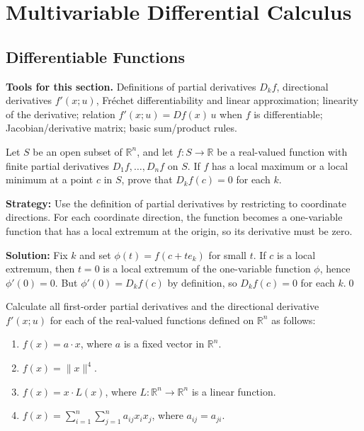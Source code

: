 \chapter{Multivariable Differential Calculus}

\section{Differentiable Functions}

\noindent\textbf{Tools for this section.} Definitions of partial derivatives $D_k f$, directional derivatives $f'(x;u)$, Fréchet differentiability and linear approximation; linearity of the derivative; relation $f'(x;u)=Df(x)\,u$ when $f$ is differentiable; Jacobian/derivative matrix; basic sum/product rules.



\begin{problembox}
\begin{problemstatement}
Let \( S \) be an open subset of \( \mathbb{R}^n \), and let \( f: S \to \mathbb{R} \) be a real-valued function with finite partial derivatives \( D_1f, \ldots, D_nf \) on \( S \). If \( f \) has a local maximum or a local minimum at a point \( c \) in \( S \), prove that \( D_kf(c) = 0 \) for each \( k \).
\end{problemstatement}
\end{problembox}

\noindent\textbf{Strategy:} Use the definition of partial derivatives by restricting to coordinate directions. For each coordinate direction, the function becomes a one-variable function that has a local extremum at the origin, so its derivative must be zero.

\bigskip\noindent\textbf{Solution:}
Fix $k$ and set $\phi(t)=f(c+te_k)$ for small $t$. If $c$ is a local extremum, then $t=0$ is a local extremum of the one-variable function $\phi$, hence $\phi'(0)=0$. But $\phi'(0)=D_k f(c)$ by definition, so $D_k f(c)=0$ for each $k$.\qed


\begin{problembox}
\begin{problemstatement}
Calculate all first-order partial derivatives and the directional derivative \( f'(x; u) \) for each of the real-valued functions defined on \( \mathbb{R}^n \) as follows:
\begin{enumerate}[label=(\alph*)]
\item \( f(x) = a \cdot x \), where \( a \) is a fixed vector in \( \mathbb{R}^n \).
\item \( f(x) = \|x\|^4 \).
\item \( f(x) = x \cdot L(x) \), where \( L : \mathbb{R}^n \to \mathbb{R}^n \) is a linear function.
\item \( f(x) = \sum_{i=1}^{n} \sum_{j=1}^{n} a_{ij}x_i x_j \), where \( a_{ij} = a_{ji} \).
\end{enumerate}
\end{problemstatement}
\end{problembox}


